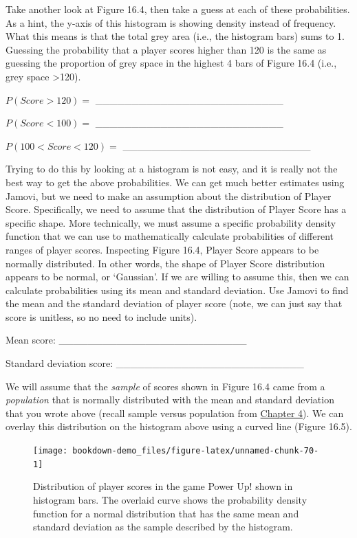 \documentclass[
]{scrbook}
\begin{document}
Take another look at Figure 16.4, then take a guess at each of these probabilities.
As a hint, the y-axis of this histogram is showing density instead of frequency.
What this means is that the total grey area (i.e., the histogram bars) sums to 1.
Guessing the probability that a player scores higher than 120 is the same as guessing the proportion of grey space in the highest 4 bars of Figure 16.4 (i.e., grey space \textgreater120).

\(P(Score>120) =\) \_\_\_\_\_\_\_\_\_\_\_\_\_\_\_\_\_\_\_\_\_\_\_\_\_\_

\(P(Score<100) =\) \_\_\_\_\_\_\_\_\_\_\_\_\_\_\_\_\_\_\_\_\_\_\_\_\_\_

\(P(100<Score<120) =\) \_\_\_\_\_\_\_\_\_\_\_\_\_\_\_\_\_\_\_\_\_\_\_\_\_\_

Trying to do this by looking at a histogram is not easy, and it is really not the best way to get the above probabilities.
We can get much better estimates using Jamovi, but we need to make an assumption about the distribution of Player Score.
Specifically, we need to assume that the distribution of Player Score has a specific shape.
More technically, we must assume a specific probability density function that we can use to mathematically calculate probabilities of different ranges of player scores.
Inspecting Figure 16.4, Player Score appears to be normally distributed.
In other words, the shape of Player Score distribution appears to be normal, or `Gaussian'.
If we are willing to assume this, then we can calculate probabilities using its mean and standard deviation.
Use Jamovi to find the mean and the standard deviation of player score (note, we can just say that score is unitless, so no need to include units).

Mean score: \_\_\_\_\_\_\_\_\_\_\_\_\_\_\_\_\_\_\_\_\_\_\_\_\_\_

Standard deviation score: \_\_\_\_\_\_\_\_\_\_\_\_\_\_\_\_\_\_\_\_\_\_\_\_\_\_

We will assume that the \emph{sample} of scores shown in Figure 16.4 came from a \emph{population} that is normally distributed with the mean and standard deviation that you wrote above (recall sample versus population from \protect\hyperlink{Chapter_4}{Chapter 4}).
We can overlay this distribution on the histogram above using a curved line (Figure 16.5).

\begin{figure}
\texttt{[image: bookdown-demo\_files/figure-latex/unnamed-chunk-70-1]} \caption{Distribution of player scores in the game Power Up! shown in histogram bars. The overlaid curve shows the probability density function for a normal distribution that has the same mean and standard deviation as the sample described by the histogram.}\label{fig:unnamed-chunk-70}
\end{figure}
\end{document}
